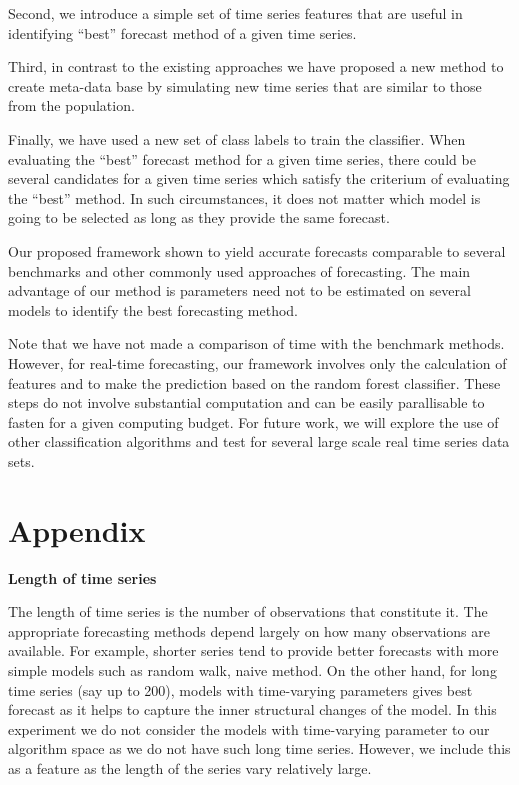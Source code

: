 \documentclass[11pt,]{article}
\theoremstyle{definition}
\theoremstyle{definition}
\theoremstyle{definition}
\theoremstyle{remark}
\begin{document}
Second, we introduce a simple set of time series features that are
useful in identifying ``best'' forecast method of a given time series.

Third, in contrast to the existing approaches we have proposed a new
method to create meta-data base by simulating new time series that are
similar to those from the population.

Finally, we have used a new set of class labels to train the classifier.
When evaluating the ``best'' forecast method for a given time series,
there could be several candidates for a given time series which satisfy
the criterium of evaluating the ``best'' method. In such circumstances,
it does not matter which model is going to be selected as long as they
provide the same forecast.

Our proposed framework shown to yield accurate forecasts comparable to
several benchmarks and other commonly used approaches of forecasting.
The main advantage of our method is parameters need not to be estimated
on several models to identify the best forecasting method.

Note that we have not made a comparison of time with the benchmark
methods. However, for real-time forecasting, our framework involves only
the calculation of features and to make the prediction based on the
random forest classifier. These steps do not involve substantial
computation and can be easily parallisable to fasten for a given
computing budget. For future work, we will explore the use of other
classification algorithms and test for several large scale real time
series data sets.

\newpage

\section{Appendix}\label{appendix}

\label{sec:appendix}

\textbf{Length of time series}

The length of time series is the number of observations that constitute
it. The appropriate forecasting methods depend largely on how many
observations are available. For example, shorter series tend to provide
better forecasts with more simple models such as random walk, naive
method. On the other hand, for long time series (say up to 200), models
with time-varying parameters gives best forecast as it helps to capture
the inner structural changes of the model. In this experiment we do not
consider the models with time-varying parameter to our algorithm space
as we do not have such long time series. However, we include this as a
feature as the length of the series vary relatively large.
\end{document}
